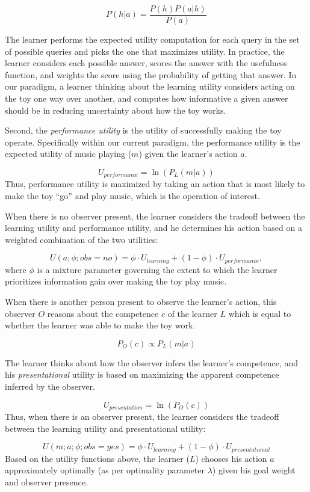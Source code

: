 \documentclass[10pt, letterpaper]{article}
\begin{document}
\[ P(h|a) = \frac{P(h)P(a|h)}{P(a)} \]

\noindent
The learner performs the expected utility computation for each query in
the set of possible queries and picks the one that maximizes utility. In
practice, the learner considers each possible answer, scores the answer
with the usefulness function, and weights the score using the
probability of getting that answer. In our paradigm, a learner thinking
about the learning utility considers acting on the toy one way over
another, and computes how informative a given answer should be in
reducing uncertainty about how the toy works.

Second, the \emph{performance utility} is the utility of successfully
making the toy operate. Specifically within our current paradigm, the
performance utility is the expected utility of music playing (\(m\))
given the learner's action \(a\).

\[ U_{performance} = \ln(P_L(m | a)) \] \noindent
Thus, performance utility is maximized by taking an action that is most
likely to make the toy ``go'' and play music, which is the operation of
interest.

When there is no observer present, the learner considers the tradeoff
between the learning utility and performance utility, and he determines
his action based on a weighted combination of the two utilities:

\[ U(a;\phi; obs = no) = \phi \cdot U_{learning} + (1-\phi) \cdot U_{performance} ,\]
\noindent
where \(\phi\) is a mixture parameter governing the extent to which the
learner prioritizes information gain over making the toy play music.

When there is another person present to observe the learner's action,
this observer \(O\) reasons about the competence \(c\) of the learner
\(L\) which is equal to whether the learner was able to make the toy
work.

\[ P_O(c) \propto P_L(m | a)\]

The learner thinks about how the observer infers the learner's
competence, and his \emph{presentational} utility is based on maximizing
the apparent competence inferred by the observer.

\[ U_{presentation} = \ln(P_O(c)) \] Thus, when there is an observer
present, the learner considers the tradeoff between the learning utility
and presentational utility:

\[ U(m;a;\phi; obs = yes) = \phi \cdot U_{learning} + (1-\phi) \cdot U_{presentational}\]
Based on the utility functions above, the learner (\(L\)) chooses his
action \(a\) approximately optimally (as per optimality parameter
\(\lambda\)) given his goal weight and observer presence.
\end{document}
